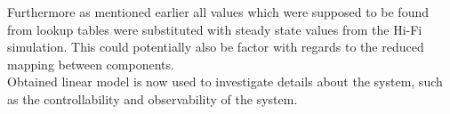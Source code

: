 Furthermore as mentioned earlier all values which were supposed to be found from lookup tables were substituted with steady state values from the Hi-Fi simulation. This could potentially also be factor with regards to the reduced mapping between components.\\

Obtained linear model is now used to investigate details about the system, such as the controllability and observability of the system.






